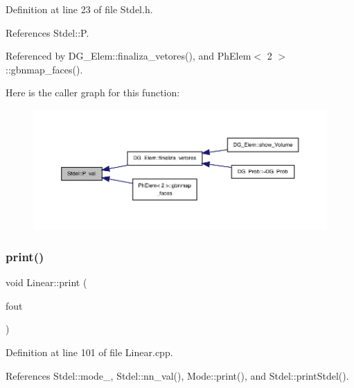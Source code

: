 Definition at line 23 of file Stdel.\+h.



References Stdel\+::P.



Referenced by D\+G\+\_\+\+Elem\+::finaliza\+\_\+vetores(), and Ph\+Elem$<$ 2 $>$\+::gbnmap\+\_\+faces().

Here is the caller graph for this function\+:
\nopagebreak
\begin{figure}[H]
\begin{center}
\leavevmode
\includegraphics[width=350pt]{classStdel_a701c7d5595d4f6632333c4202898983b_icgraph}
\end{center}
\end{figure}
\mbox{\label{classLinear_aabc086149c2ed718efe5f7be6c22f8d4}} 
\subsubsection{\texorpdfstring{print()}{print()}}
{\footnotesize\ttfamily void Linear\+::print (\begin{DoxyParamCaption}\item[{F\+I\+LE $\ast$}]{fout }\end{DoxyParamCaption})}



Definition at line 101 of file Linear.\+cpp.



References Stdel\+::mode\+\_\+, Stdel\+::nn\+\_\+val(), Mode\+::print(), and Stdel\+::print\+Stdel().

